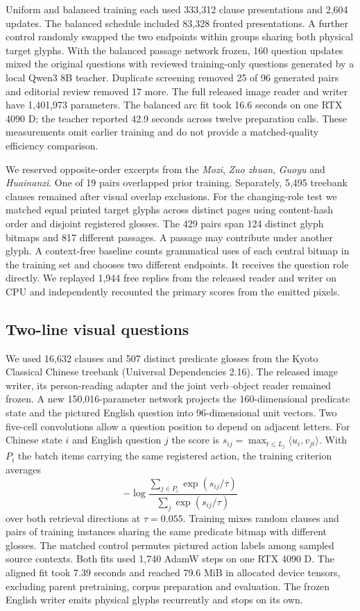 \documentclass[12pt,a4paper]{article}
\providecommand{\DIFadd}[1]{{\protect\color{blue} \sf #1}} %
\begin{document}
\DIFadd{Uniform and balanced training each used 333,312 clause presentations and 2,604 updates. The balanced schedule included 83,328 fronted presentations. A further control randomly swapped the two endpoints within groups sharing both physical target glyphs. With the balanced passage network frozen, 160 question updates mixed the original questions with reviewed training-only questions generated by a local Qwen3 8B teacher. Duplicate screening removed 25 of 96 generated pairs and editorial review removed 17 more. The full released image reader and writer have 1,401,973 parameters. The balanced arc fit took 16.6 seconds on one RTX 4090 D; the teacher reported 42.9 seconds across twelve preparation calls. These measurements omit earlier training and do not provide a matched-quality efficiency comparison.
}

\DIFadd{We reserved opposite-order excerpts from the \textit{Mozi}, \textit{Zuo zhuan}, \textit{Guoyu} and \textit{Huainanzi}. One of 19 pairs overlapped prior training. Separately, 5,495 treebank clauses remained after visual overlap exclusions. For the changing-role test we matched equal printed target glyphs across distinct pages using content-hash order and disjoint registered glosses. The 429 pairs span 124 distinct glyph bitmaps and 817 different passages. A passage may contribute under another glyph. A context-free baseline counts grammatical uses of each central bitmap in the training set and chooses two different endpoints. It receives the question role directly. We replayed 1,944 free replies from the released reader and writer on CPU and independently recounted the primary scores from the emitted pixels.
}

\subsection*{\DIFadd{Two-line visual questions}}
\DIFadd{We used 16,632 clauses and 507 distinct predicate glosses from the Kyoto Classical Chinese treebank (Universal Dependencies 2.16). The released image writer, its person-reading adapter and the joint verb--object reader remained frozen. A new 150,016-parameter network projects the 160-dimensional predicate state and the pictured English question into 96-dimensional unit vectors. Two five-cell convolutions allow a question position to depend on adjacent letters. For Chinese state $i$ and English question $j$ the score is $s_{ij}=\max_{t\leq L_j}\langle u_i,v_{jt}\rangle$. With $P_i$ the batch items carrying the same registered action, the training criterion averages
}\[
-\log\frac{\sum_{j\in P_i}\exp(s_{ij}/\tau)}{\sum_j\exp(s_{ij}/\tau)}
\]
\DIFadd{over both retrieval directions at $\tau=0.055$. Training mixes random clauses and pairs of training instances sharing the same predicate bitmap with different glosses. The matched control permutes pictured action labels among sampled source contexts. Both fits used 1,740 AdamW steps on one RTX 4090 D. The aligned fit took 7.39 seconds and reached 79.6 MiB in allocated device tensors, excluding parent pretraining, corpus preparation and evaluation. The frozen English writer emits physical glyphs recurrently and stops on its own.
}
\end{document}
